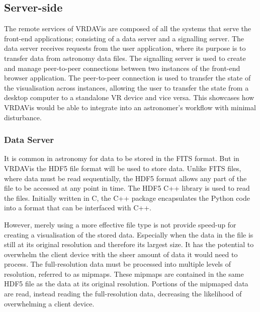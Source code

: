 \subsection{Server-side}
\label{sec:remote services}

The remote services of VRDAVis are composed of all the systems that serve the front-end applications; consisting of a data server and a signalling server. 
The data server receives requests from the user application, where its purpose is to transfer data from astronomy data files. 
The signalling server is used to create and manage peer-to-peer connections between two instances of the front-end browser application. 
The peer-to-peer connection is used to transfer the state of the visualisation across instances, allowing the user to transfer the state from a desktop computer to a standalone VR device and vice versa. 
This showcases how VRDAVis would be able to integrate into an astronomer's workflow with minimal disturbance.

\subsubsection{Data Server}
It is common in astronomy for data to be stored in the FITS format.
But in VRDAVis the HDF5 file format will be used to store data. 
Unlike FITS files, where data must be read sequentially, the HDF5 format allows any part of the file to be accessed at any point in time. %
The HDF5 C++ library is used to read the files. 
Initially written in C, the C++ package encapsulates the Python code into a format that can be interfaced with C++.

However, merely using a more effective file type is not provide speed-up for creating a visualisation of the stored data. 
Especially when the data in the file is still at its original resolution and therefore its largest size. 
It has the potential to overwhelm the client device with the sheer amount of data it would need to process.
The full-resolution data must be processed into multiple levels of resolution, referred to as mipmaps. 
These mipmaps are contained in the same HDF5 file as the data at its original resolution. 
Portions of the mipmaped data are read, instead reading the full-resolution data, decreasing the likelihood of overwhelming a client device.

